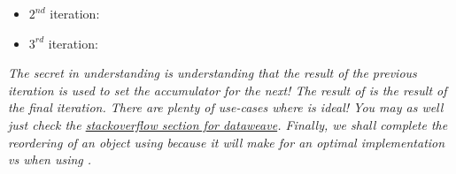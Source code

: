 \begin{enumerate}[resume*]
\begin{itemize}
  \item $2^{nd}$ iteration: 
  \item $3^{rd}$ iteration: 
  \end{itemize}
  \emph{
    The secret in understanding  is understanding that the result of the previous iteration is used to set the accumulator for the next!  The result of  is the result of the final iteration.
    \newline
    There are plenty of use-cases where  is ideal!  You may as well just check the \href{https://stackoverflow.com/questions/tagged/dataweave}{stackoverflow section for dataweave}.  Finally, we shall complete the reordering of an object using  because it will make for an optimal implementation vs when using . 
  }
\end{enumerate}

